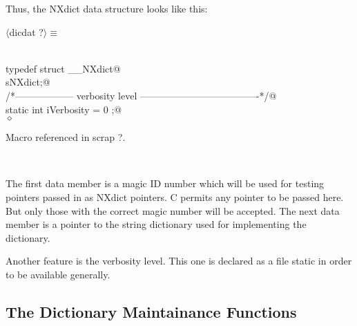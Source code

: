 \documentclass[12pt]{article}
\begin{document}
Thus, the NXdict data structure looks like this:
\begin{flushleft} \small
\begin{minipage}{\linewidth} \label{scrap5}
$\langle$dicdat {\footnotesize ?}$\rangle\equiv$
\vspace{-1ex}
\begin{list}{}{} \item
\mbox{}\verb@@\\
\mbox{}\verb@    typedef struct __NXdict@\\
\mbox{} sNXdict;@\\
\mbox{}\verb@/*------------------ verbosity level -------------------------------------*/@\\
\mbox{}\verb@   static int iVerbosity = 0 ;@\\
\mbox{}\verb@@$\diamond$
\end{list}
\vspace{-1ex}
\footnotesize\addtolength{\baselineskip}{-1ex}
\begin{list}{}{\setlength{\itemsep}{-\parsep}\setlength{\itemindent}{-\leftmargin}}
\item Macro referenced in scrap ?.
\end{list}
\end{minipage}\\[4ex]
\end{flushleft}
The first data member is a magic ID number which will be used for testing
pointers passed in as NXdict pointers. C permits any pointer to be passed
here. But only those with the correct magic number will be accepted. The
next data member is a pointer to the string dictionary used for implementing
the dictionary.

Another feature is the verbosity level. This one is declared as a file
static in order to be available generally.

\subsection{The Dictionary Maintainance Functions}
\end{document}
